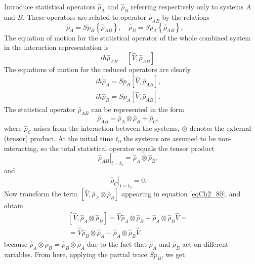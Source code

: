 Introduce statistical operators $\hat{\rho}_{A}$ and $\hat{\rho}_{B}$ referring respectively only to systems $A$ and $B$. These operators are related to operator $\hat{\rho}_{AB}$ by the relations 
\begin{equation}
\hat{\rho}_{A} = Sp_B\left\{\hat{\rho}_{AB}\right\}, \quad
\hat{\rho}_{B} = Sp_A\left\{\hat{\rho}_{AB}\right\}, \quad
\label{eqCh2_78}
\end{equation}
The equation of motion for the statistical operator of the whole combined system in the interaction representation is 
\begin{equation}
i\hbar\dot{\hat{\rho}}_{AB}
 = \left[
\hat{V}, \hat{\rho}_{AB}
\right].
\label{eqCh2_79}
\end{equation}
The equations of motion for the reduced operators are clearly 
\begin{eqnarray}
i\hbar\dot{\hat{\rho}}_{A} = Sp_B
\left[
\hat{V}, \hat{\rho}_{AB}
\right],
\nonumber \\
i\hbar\dot{\hat{\rho}}_{B} = Sp_A
\left[
\hat{V}, \hat{\rho}_{AB}
\right].
\label{eqCh2_80}
\end{eqnarray}
The statistical operator $\hat{\rho}_{AB}$ can be represented in the form
\begin{equation}
\hat{\rho}_{AB} = \hat{\rho}_{A} \otimes \hat{\rho}_{B} + \hat{\rho}_{C},
\label{eqCh2_81}
\end{equation}
where $\hat{\rho}_{C}$ arises from the interaction between the systems, $\otimes$ denotes the external (tensor) product. 
At the initial time $t_0$ the systems are assumed to be non-interacting, so the total statistical operator equals the tensor product 
\[
\left.\hat{\rho}_{AB}\right|_{t = t_0} = \hat{\rho}_{A} \otimes \hat{\rho}_{B},
\] 
and 
\[
\left.\hat{\rho}_{C}\right|_{t = t_0} = 0.
\] 
Now transform the term 
$\left[\hat{V}, \hat{\rho}_{A} \otimes \hat{\rho}_{B}\right]$
appearing in equation \eqref{eqCh2_80}, and obtain  
\begin{eqnarray}
\left[\hat{V}, \hat{\rho}_{A} \otimes \hat{\rho}_{B}\right] = 
\hat{V}  \hat{\rho}_{A} \otimes \hat{\rho}_{B} - 
\hat{\rho}_{A} \otimes \hat{\rho}_{B} \hat{V} = 
\nonumber \\
= \hat{V}  \hat{\rho}_{B} \otimes \hat{\rho}_{A} - 
\hat{\rho}_{A} \otimes \hat{\rho}_{B} \hat{V}.
\label{eqCh2_82}
\end{eqnarray}
because 
\(
\hat{\rho}_{A} \otimes \hat{\rho}_{B} = 
\hat{\rho}_{B} \otimes \hat{\rho}_{A}
\)   due to the fact that $\hat{\rho}_{A}$ and $\hat{\rho}_{B}$ act on different variables. From here, applying the partial trace $Sp_B$, we get 
